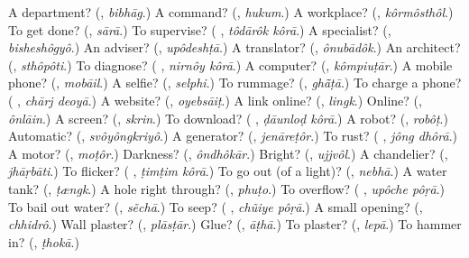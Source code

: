 \begin{tcolorbox}[breakable,colback=teal!4,colframe=teal!35!black,title={Before you move on}]
A department? (\textbf{}, \emph{bibhāg}.) A command? (\textbf{}, \emph{hukum}.) A workplace? (\textbf{}, \emph{kôrmôsthôl}.) To get done? (\textbf{}, \emph{sārā}.) To supervise? (\textbf{ }, \emph{tôdārôk kôrā}.) A specialist? (\textbf{}, \emph{bisheshôgyô}.) An adviser? (\textbf{}, \emph{upôdeshṭā}.) A translator? (\textbf{}, \emph{ônubādôk}.) An architect? (\textbf{}, \emph{sthôpôti}.) To diagnose? (\textbf{ }, \emph{nirnôy kôrā}.) A computer? (\textbf{}, \emph{kômpiuṭār}.) A mobile phone? (\textbf{}, \emph{mobāil}.) A selfie? (\textbf{}, \emph{selphi}.) To rummage? (\textbf{}, \emph{ghā̃ṭā}.) To charge a phone? (\textbf{ }, \emph{chārj deoyā}.) A website? (\textbf{}, \emph{oyebsāiṭ}.) A link online? (\textbf{}, \emph{lingk}.) Online? (\textbf{}, \emph{ônlāin}.) A screen? (\textbf{}, \emph{skrin}.) To download? (\textbf{ }, \emph{ḍāunloḍ kôrā}.) A robot? (\textbf{}, \emph{robôṭ}.) Automatic? (\textbf{}, \emph{svôyôngkriyô}.) A generator? (\textbf{}, \emph{jenāreṭôr}.) To rust? (\textbf{ }, \emph{jông dhôrā}.) A motor? (\textbf{}, \emph{moṭôr}.) Darkness? (\textbf{}, \emph{ôndhôkār}.) Bright? (\textbf{}, \emph{ujjvôl}.) A chandelier? (\textbf{}, \emph{jhāṛbāti}.) To flicker? (\textbf{ }, \emph{ṭimṭim kôrā}.) To go out (of a light)? (\textbf{}, \emph{nebhā}.) A water tank? (\textbf{}, \emph{ṭængk}.) A hole right through? (\textbf{}, \emph{phuṭo}.) To overflow? (\textbf{ }, \emph{upôche pôṛā}.) To bail out water? (\textbf{}, \emph{sẽchā}.) To seep? (\textbf{ }, \emph{chũiye pôṛā}.) A small opening? (\textbf{}, \emph{chhidrô}.) Wall plaster? (\textbf{}, \emph{plāsṭār}.) Glue? (\textbf{}, \emph{āṭhā}.) To plaster? (\textbf{}, \emph{lepā}.) To hammer in? (\textbf{}, \emph{ṭhokā}.)
\end{tcolorbox}
